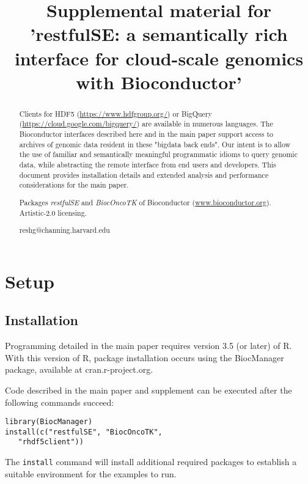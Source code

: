 \documentclass[applications]{gen-bioinformatics}
\author[1]{\pfnm{Shweta}
  \pinit{}
  \psnm{Gopaulakrishnan}}
\author[1]{\pfnm{Samuela}
  \pinit{}
  \psnm{Pollack}}
\author[1]{\pfnm{Benjamin}
  \pinit{}
  \psnm{Stubbs}}
\author[2]{\pfnm{Herv\'e}
  \pinit{}
  \psnm{Pag\`es}}
\author[3]{\pfnm{John}
  \pinit{}
  \psnm{Readey}}
\author[4]{\pfnm{Sean}
  \pinit{}
  \psnm{Davis}}
\author[5]{\pfnm{Levi}
  \pinit{}
  \psnm{Waldron}}
\author[6]{\pfnm{Martin}
  \pinit{T}
  \psnm{Morgan}}
\author[1]{\pfnm{Vincent}
  \pinit{J}
  \psnm{Carey}}
\newcommand{\BiocpackageFirst}[1]{{\textit{#1}}}
\begin{document}
\title{Supplemental material for 'restfulSE: a semantically rich interface for cloud-scale genomics
with Bioconductor'}
\maketitle

\begin{abstract}
\begin{subabstract}[Summary]
Clients for
HDF5 (\url{https://www.hdfgroup.org/}) or BigQuery (\url{https://cloud.google.com/bigquery/}) are available in numerous languages.
The
Bioconductor interfaces described here and
in the main paper support access to archives of genomic
data resident in these "bigdata back ends". 
Our intent is to allow the
use of familiar and semantically meaningful programmatic idioms
to query genomic data,
while abstracting the remote interface from end users
and developers.
This document provides installation details and extended
analysis and performance considerations for the main paper.
\end{subabstract}
\begin{subabstract}[Availability] Packages \BiocpackageFirst{restfulSE} and
\BiocpackageFirst{BiocOncoTK} of Bioconductor
 (\url {www.bioconductor.org}).  Artistic-2.0 licensing.  
\end{subabstract}
\begin{subabstract}[Contact]reshg@channing.harvard.edu
\end{subabstract}
\end{abstract}

\section*{Setup}
\subsection*{Installation}

Programming detailed in the main paper requires 
version 3.5 (or later) of R.  With this version
of R, package installation occurs using the
BiocManager package, available at cran.r-project.org.

Code described in the main paper and supplement can be 
executed after the following commands succeed:
\begin{verbatim}
library(BiocManager)
install(c("restfulSE", "BiocOncoTK",
   "rhdf5client"))
\end{verbatim}
The \texttt{install} command will install additional
required packages to establish a suitable environment
for the examples to run.
\end{document}
